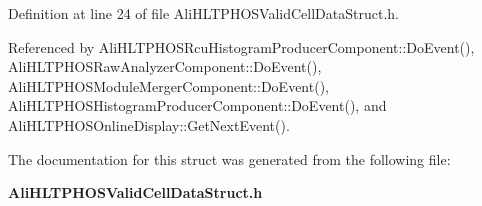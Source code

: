 Definition at line 24 of file Ali\-HLTPHOSValid\-Cell\-Data\-Struct.h.

Referenced by Ali\-HLTPHOSRcu\-Histogram\-Producer\-Component::Do\-Event(), Ali\-HLTPHOSRaw\-Analyzer\-Component::Do\-Event(), Ali\-HLTPHOSModule\-Merger\-Component::Do\-Event(), Ali\-HLTPHOSHistogram\-Producer\-Component::Do\-Event(), and Ali\-HLTPHOSOnline\-Display::Get\-Next\-Event().

The documentation for this struct was generated from the following file:\begin{CompactItemize}
\item 
{\bf Ali\-HLTPHOSValid\-Cell\-Data\-Struct.h}\end{CompactItemize}
